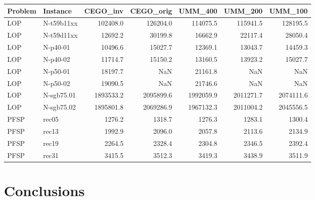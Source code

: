 \documentclass[sigconf,dvipsnames]{acmart}
\begin{document}
\begin{table}[tb]%
\begin{tabular}{llrrrrr}
\toprule
Problem &    Instance &   CEGO\_inv &   CEGO\_orig &   UMM\_400 &   UMM\_200 &   UMM\_100 \\
\midrule
    LOP &  N-t59b11xx &          102408.0 &           126204.0 &         114075.5 &         115941.5 &         128195.5 \\
    LOP &  N-t59d11xx &           12692.2 &            30199.8 &          16662.9 &          22117.4 &          28050.4 \\
    LOP &    N-p40-01 &           10496.6 &            15027.7 &          12369.1 &          13043.7 &          14459.3 \\
    LOP &    N-p40-02 &           11714.7 &            15150.2 &          13160.5 &          13923.2 &          15027.7 \\
    LOP &    N-p50-01 &           18197.7 &                NaN &          21161.8 &              NaN &              NaN \\
    LOP &    N-p50-02 &           19090.5 &                NaN &          21746.6 &              NaN &              NaN \\
    LOP &  N-sgb75.01 &         1893533.2 &          2095899.6 &        1992059.9 &        2011271.7 &        2074111.6 \\
    LOP &  N-sgb75.02 &         1895801.8 &          2069286.9 &        1967132.3 &        2011004.2 &        2045556.5 \\
   PFSP &       rec05 &            1276.2 &             1318.7 &           1276.3 &           1283.1 &           1300.4 \\
   PFSP &       rec13 &            1992.9 &             2096.0 &           2057.8 &           2113.6 &           2134.9 \\
   PFSP &       rec19 &            2264.5 &             2328.4 &           2304.8 &           2346.5 &           2392.4 \\
   PFSP &       rec31 &            3415.5 &             3512.3 &           3419.3 &           3438.9 &           3511.9 \\
\bottomrule
\end{tabular}
\end{table}



\section{Conclusions}\label{sec:conclusions}
\end{document}
